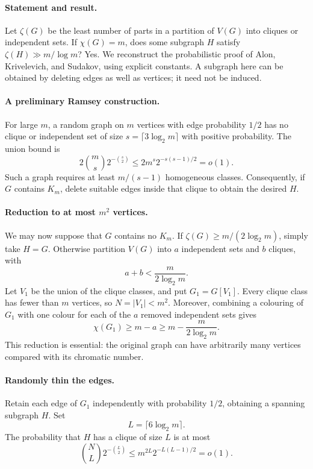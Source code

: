 \paragraph{Statement and result.}
Let \(\zeta(G)\) be the least number of parts in a partition of \(V(G)\) into cliques or independent sets. If \(\chi(G)=m\), does some subgraph \(H\) satisfy \(\zeta(H)\gg m/\log m\)? Yes. We reconstruct the probabilistic proof of Alon, Krivelevich, and Sudakov, using explicit constants. A subgraph here can be obtained by deleting edges as well as vertices; it need not be induced.

\paragraph{A preliminary Ramsey construction.}
For large \(m\), a random graph on \(m\) vertices with edge probability \(1/2\) has no clique or independent set of size \(s=\lceil3\log_2 m\rceil\) with positive probability. The union bound is
\[
 2\binom ms2^{-\binom s2}
 \leq2m^s2^{-s(s-1)/2}=o(1).
\]
Such a graph requires at least \(m/(s-1)\) homogeneous classes. Consequently, if \(G\) contains \(K_m\), delete suitable edges inside that clique to obtain the desired \(H\).

\paragraph{Reduction to at most \(m^2\) vertices.}
We may now suppose that \(G\) contains no \(K_m\). If \(\zeta(G)\geq m/(2\log_2 m)\), simply take \(H=G\). Otherwise partition \(V(G)\) into \(a\) independent sets and \(b\) cliques, with
\[
 a+b<\frac{m}{2\log_2m}.
\]
Let \(V_1\) be the union of the clique classes, and put \(G_1=G[V_1]\). Every clique class has fewer than \(m\) vertices, so \(N=|V_1|<m^2\). Moreover, combining a colouring of \(G_1\) with one colour for each of the \(a\) removed independent sets gives
\[
 \chi(G_1)\geq m-a\geq m-\frac{m}{2\log_2m}. \tag{1}
\]
This reduction is essential: the original graph can have arbitrarily many vertices compared with its chromatic number.

\paragraph{Randomly thin the edges.}
Retain each edge of \(G_1\) independently with probability \(1/2\), obtaining a spanning subgraph \(H\). Set
\[
 L=\lceil6\log_2m\rceil.
\]
The probability that \(H\) has a clique of size \(L\) is at most
\[
 \binom NL2^{-\binom L2}
 \leq m^{2L}2^{-L(L-1)/2}=o(1). \tag{2}
\]

